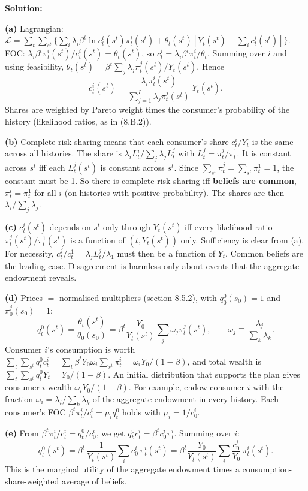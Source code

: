 \documentclass[12pt, letterpaper]{article}
\begin{document}
\begin{tcolorbox}[evenbox,title={Exercise 8.16 \quad Diverse beliefs, II}]
\textbf{Solution:}

\textbf{(a)} Lagrangian:
$\mathcal L=\sum_t\sum_{s^t}\big\{\sum_i\lambda_i\beta^t\ln c^i_t(s^t)\pi^i_t(s^t)+\theta_t(s^t)[Y_t(s^t)-\sum_ic^i_t(s^t)]\big\}$.
FOC: $\lambda_i\beta^t\pi^i_t(s^t)/c^i_t(s^t)=\theta_t(s^t)$, so $c^i_t=\lambda_i\beta^t\pi^i_t/\theta_t$. Summing over $i$ and using
feasibility, $\theta_t(s^t)=\beta^t\sum_j\lambda_j\pi^j_t(s^t)/Y_t(s^t)$. Hence
\[
\boxed{c^i_t(s^t)=\frac{\lambda_i\pi^i_t(s^t)}{\sum_{j=1}^I\lambda_j\pi^j_t(s^t)}\,Y_t(s^t).}
\]
Shares are weighted by Pareto weight times the consumer's probability of the history (likelihood ratios, as in (8.B.2)).

\textbf{(b)} Complete risk sharing means that each consumer's share $c^i_t/Y_t$ is the same across all histories.
The share is $\lambda_iL^i_t/\sum_j\lambda_jL^j_t$ with $L^j_t=\pi^j_t/\pi^1_t$. It is constant across $s^t$ iff each
$L^j_t(s^t)$ is constant across $s^t$. Since $\sum_{s^t}\pi^j_t=\sum_{s^t}\pi^1_t=1$, the constant must be 1. So there is
complete risk sharing iff \textbf{beliefs are common}, $\pi^i_t=\pi^1_t$ for all $i$ (on histories with positive
probability). The shares are then $\lambda_i/\sum_j\lambda_j$.

\textbf{(c)} $c^i_t(s^t)$ depends on $s^t$ only through $Y_t(s^t)$ iff every likelihood ratio $\pi^j_t(s^t)/\pi^1_t(s^t)$
is a function of $(t,Y_t(s^t))$ only. Sufficiency is clear from (a). For necessity, $c^j_t/c^1_t=\lambda_jL^j_t/\lambda_1$
must then be a function of $Y_t$. Common beliefs are the leading case. Disagreement is harmless only about events
that the aggregate endowment reveals.

\textbf{(d)} Prices $=$ normalised multipliers (section 8.5.2), with $q^0_0(s_0)=1$ and $\pi^j_0(s_0)=1$:
\[
q^0_t(s^t)=\frac{\theta_t(s^t)}{\theta_0(s_0)}=\beta^t\frac{Y_0}{Y_t(s^t)}\sum_j\omega_j\pi^j_t(s^t),\qquad
\omega_j\equiv\frac{\lambda_j}{\sum_k\lambda_k}.
\]
Consumer $i$'s consumption is worth
$\sum_t\sum_{s^t}q^0_tc^i_t=\sum_t\beta^tY_0\omega_i\sum_{s^t}\pi^i_t=\omega_iY_0/(1-\beta)$, and total wealth is
$\sum_t\sum_{s^t}q^0_tY_t=Y_0/(1-\beta)$. An initial distribution that supports the plan gives consumer $i$ wealth
$\omega_iY_0/(1-\beta)$. For example, endow consumer $i$ with the fraction $\omega_i=\lambda_i/\sum_k\lambda_k$ of the
aggregate endowment in every history. Each consumer's FOC $\beta^t\pi^i_t/c^i_t=\mu_iq^0_t$ holds with
$\mu_i=1/c^i_0$.

\textbf{(e)} From $\beta^t\pi^i_t/c^i_t=q^0_t/c^i_0$, we get $q^0_tc^i_t=\beta^tc^i_0\pi^i_t$. Summing over $i$:
\[
\boxed{q^0_t(s^t)=\beta^t\,\frac{1}{Y_t(s^t)}\sum_ic^i_0\,\pi^i_t(s^t)=\beta^t\frac{Y_0}{Y_t(s^t)}\sum_i\frac{c^i_0}{Y_0}\,\pi^i_t(s^t).}
\]
This is the marginal utility of the aggregate endowment times a consumption-share-weighted average of beliefs.


\end{tcolorbox}
\end{document}
